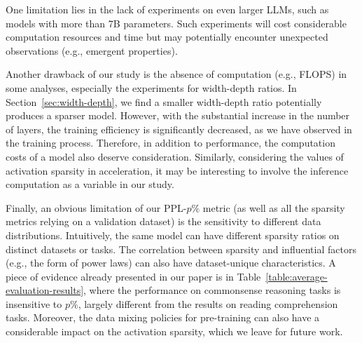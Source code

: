 \documentclass{article} %
\begin{document}
One limitation lies in the lack of experiments on even larger LLMs, such as models with more than 7B parameters. Such experiments will cost considerable computation resources and time but may potentially encounter unexpected observations (e.g., emergent properties).

Another drawback of our study is the absence of computation (e.g., FLOPS) in some analyses, especially the experiments for width-depth ratios. In Section~\ref{sec:width-depth}, we find a smaller width-depth ratio potentially produces a sparser model. However, with the substantial increase in the number of layers, the training efficiency is significantly decreased, as we have observed in the training process. Therefore, in addition to performance, the computation costs of a model also deserve consideration. Similarly, considering the values of activation sparsity in acceleration, it may be interesting to involve the inference computation as a variable in our study.

Finally, an obvious limitation of our PPL-$p\%$ metric (as well as all the sparsity metrics relying on a validation dataset) is the sensitivity to different data distributions. Intuitively, the same model can have different sparsity ratios on distinct datasets or tasks. The correlation between sparsity and influential factors (e.g., the form of power laws) can also have dataset-unique characteristics. A piece of evidence already presented in our paper is in Table~\ref{table:average-evaluation-results}, where the performance on commonsense reasoning tasks is insensitive to $p\%$, largely different from the results on reading comprehension tasks. Moreover, the data mixing policies for pre-training can also have a considerable impact on the activation sparsity, which we leave for future work.


\end{document}
